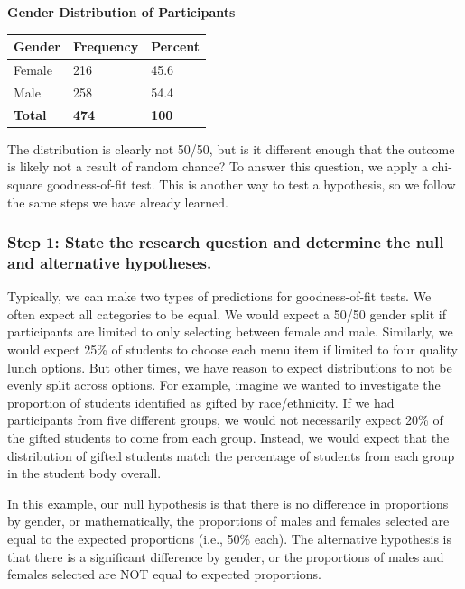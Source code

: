 \documentclass[
  letterpaper,
  DIV=11,
  numbers=noendperiod]{scrreprt}
\begin{document}
\textbf{Gender Distribution of Participants}

\begin{longtable}[]{@{}lll@{}}
\toprule\noalign{}
Gender & Frequency & Percent \\
\midrule\noalign{}
\endhead
\bottomrule\noalign{}
\endlastfoot
Female & 216 & 45.6 \\
Male & 258 & 54.4 \\
\textbf{Total} & \textbf{474} & \textbf{100} \\
\end{longtable}

The distribution is clearly not 50/50, but is it different enough that
the outcome is likely not a result of random chance? To answer this
question, we apply a chi-square goodness-of-fit test. This is another
way to test a hypothesis, so we follow the same steps we have already
learned.

\subsubsection*{Step 1: State the research question and determine the
null and alternative
hypotheses.}\label{step-1-state-the-research-question-and-determine-the-null-and-alternative-hypotheses.-1}

Typically, we can make two types of predictions for goodness-of-fit
tests. We often expect all categories to be equal. We would expect a
50/50 gender split if participants are limited to only selecting between
female and male. Similarly, we would expect 25\% of students to choose
each menu item if limited to four quality lunch options. But other
times, we have reason to expect distributions to not be evenly split
across options. For example, imagine we wanted to investigate the
proportion of students identified as gifted by race/ethnicity. If we had
participants from five different groups, we would not necessarily expect
20\% of the gifted students to come from each group. Instead, we would
expect that the distribution of gifted students match the percentage of
students from each group in the student body overall.

In this example, our null hypothesis is that there is no difference in
proportions by gender, or mathematically, the proportions of males and
females selected are equal to the expected proportions (i.e., 50\%
each). The alternative hypothesis is that there is a significant
difference by gender, or the proportions of males and females selected
are NOT equal to expected proportions.
\end{document}
